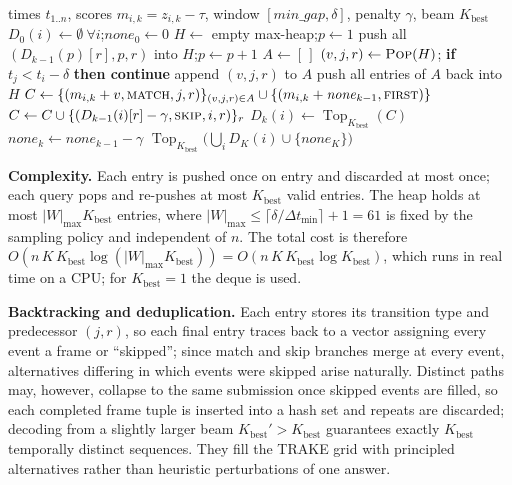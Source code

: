 \documentclass[runningheads]{llncs}
\newcommand{\Kb}{K_{\mathrm{best}}}
\begin{document}
\begin{algorithm}[t]
\caption{K-Best Monotonic DP for one candidate video}
\label{alg:kbest}
\small
\begin{algorithmic}[1]
\Require times $t_{1..n}$, scores $m_{i,k}=z_{i,k}-\tau$, window $[\mathit{min\_gap},\delta]$, penalty $\gamma$, beam $\Kb$
\State $D_0(i)\gets\emptyset\ \forall i$;\quad $\mathit{none}_0\gets0$
  \State $H\gets$ empty max-heap;\quad $p\gets1$ 
     
      \State push all $(D_{k-1}(p)[r],p,r)$ into $H$;\quad $p\gets p+1$
    \EndWhile
    \State $A\gets[\,]$
    \While{$|A|<\Kb$ \textbf{and} $H\neq\emptyset$}
      \State $(v,j,r)\gets\textsc{Pop}(H)$; \textbf{if} $t_j<t_i-\delta$ \textbf{then continue} 
      \State append $(v,j,r)$ to $A$
    \EndWhile
    \State push all entries of $A$ back into $H$
    \State $C\gets\{(m_{i,k}+v,\textsc{match},j,r)\}_{(v,j,r)\in A}\cup\{(m_{i,k}+\mathit{none}_{k-1},\textsc{first})\}$
    \State $C\gets C\cup\{(D_{k-1}(i)[r]-\gamma,\textsc{skip},i,r)\}_r$
    \State $D_k(i)\gets\operatorname{Top}_{\Kb}(C)$ 
  \EndFor
  \State $\mathit{none}_k\gets\mathit{none}_{k-1}-\gamma$
\EndFor
\State \Return $\operatorname{Top}_{\Kb}\big(\bigcup_i D_K(i)\cup\{\mathit{none}_K\}\big)$
\end{algorithmic}
\end{algorithm}

\textbf{Complexity.} Each entry is pushed once on entry and discarded at most once; each query pops and re-pushes at most $\Kb$ valid entries. The heap holds at most $|W|_{\max}\Kb$ entries, where $|W|_{\max}\le\lceil\delta/\Delta t_{\min}\rceil+1=61$ is fixed by the sampling policy and independent of $n$. The total cost is therefore $O(n\,K\,\Kb\log(|W|_{\max}\Kb))=O(n\,K\,\Kb\log\Kb)$, which runs in real time on a CPU; for $\Kb=1$ the deque is used.

\textbf{Backtracking and deduplication.} Each entry stores its transition type and predecessor $(j,r)$, so each final entry traces back to a vector assigning every event a frame or ``skipped''; since match and skip branches merge at every event, alternatives differing in which events were skipped arise naturally. Distinct paths may, however, collapse to the same submission once skipped events are filled, so each completed frame tuple is inserted into a hash set and repeats are discarded; decoding from a slightly larger beam $\Kb'>\Kb$ guarantees exactly $\Kb$ temporally distinct sequences. They fill the TRAKE grid with principled alternatives rather than heuristic perturbations of one answer.
\end{document}
